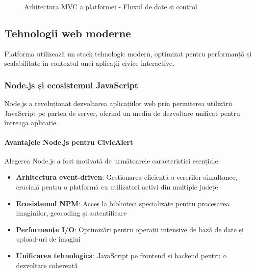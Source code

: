 \documentclass[12pt,a4paper]{report}
\begin{document}
\begin{figure}[htbp]
\caption{Arhitectura MVC a platformei - Fluxul de date și control}
\label{fig:mvc_architecture}
\end{figure}



\subsection{Tehnologii web moderne}

Platforma utilizează un stack tehnologic modern, optimizat pentru performanță și scalabilitate în contextul unei aplicații civice interactive.

\subsubsection{Node.js și ecosistemul JavaScript}

Node.js a revoluționat dezvoltarea aplicațiilor web prin permiterea utilizării JavaScript pe partea de server, oferind un mediu de dezvoltare unificat pentru întreaga aplicație.

\paragraph{Avantajele Node.js pentru CivicAlert}

Alegerea Node.js a fost motivată de următoarele caracteristici esențiale:

\begin{itemize}
    \item \textbf{Arhitectura event-driven}: Gestionarea eficientă a cererilor simultanee, crucială pentru o platformă cu utilizatori activi din multiple județe
    \item \textbf{Ecosistemul NPM}: Acces la biblioteci specializate pentru procesarea imaginilor, geocoding și autentificare
    \item \textbf{Performanțe I/O}: Optimizări pentru operații intensive de bază de date și upload-uri de imagini
    \item \textbf{Unificarea tehnologică}: JavaScript pe frontend și backend pentru o dezvoltare coherentă
\end{itemize}
\end{document}
